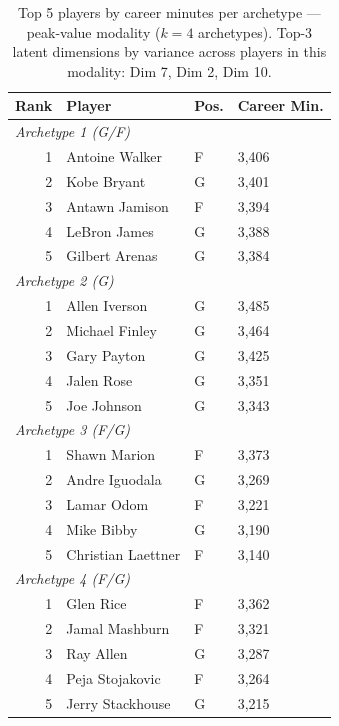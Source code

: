 \begin{table}[htbp]
  \centering\small
  \begin{tabular}{rlll}
    \toprule
    Rank & Player & Pos. & Career Min. \\
    \midrule
    \multicolumn{4}{l}{\textit{Archetype 1 (G/F)}} \\
    \midrule
    1 & Antoine Walker & F & 3,406 \\
    2 & Kobe Bryant & G & 3,401 \\
    3 & Antawn Jamison & F & 3,394 \\
    4 & LeBron James & G & 3,388 \\
    5 & Gilbert Arenas & G & 3,384 \\
    \midrule[0.4pt]
    \multicolumn{4}{l}{\textit{Archetype 2 (G)}} \\
    \midrule
    1 & Allen Iverson & G & 3,485 \\
    2 & Michael Finley & G & 3,464 \\
    3 & Gary Payton & G & 3,425 \\
    4 & Jalen Rose & G & 3,351 \\
    5 & Joe Johnson & G & 3,343 \\
    \midrule[0.4pt]
    \multicolumn{4}{l}{\textit{Archetype 3 (F/G)}} \\
    \midrule
    1 & Shawn Marion & F & 3,373 \\
    2 & Andre Iguodala & G & 3,269 \\
    3 & Lamar Odom & F & 3,221 \\
    4 & Mike Bibby & G & 3,190 \\
    5 & Christian Laettner & F & 3,140 \\
    \midrule[0.4pt]
    \multicolumn{4}{l}{\textit{Archetype 4 (F/G)}} \\
    \midrule
    1 & Glen Rice & F & 3,362 \\
    2 & Jamal Mashburn & F & 3,321 \\
    3 & Ray Allen & G & 3,287 \\
    4 & Peja Stojakovic & F & 3,264 \\
    5 & Jerry Stackhouse & G & 3,215 \\
    \bottomrule
  \end{tabular}
  \caption{Top 5 players by career minutes per archetype --- peak-value modality ($k=4$ archetypes). Top-3 latent dimensions by variance across players in this modality: Dim 7, Dim 2, Dim 10.}
  \label{tab:arch_reps_peak_value}
\end{table}

